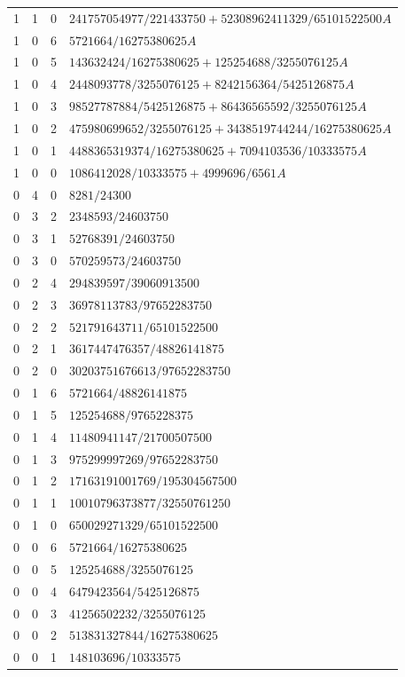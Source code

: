 \begin{longtable}{rrrl}
1 & 1 & 0 & $241757054977/221433750+52308962411329/65101522500A$\\
1 & 0 & 6 & $5721664/16275380625A$\\
1 & 0 & 5 & $143632424/16275380625+125254688/3255076125A$\\
1 & 0 & 4 & $2448093778/3255076125+8242156364/5425126875A$\\
1 & 0 & 3 & $98527787884/5425126875+86436565592/3255076125A$\\
1 & 0 & 2 & $475980699652/3255076125+3438519744244/16275380625A$\\
1 & 0 & 1 & $4488365319374/16275380625+7094103536/10333575A$\\
1 & 0 & 0 & $1086412028/10333575+4999696/6561A$\\
0 & 4 & 0 & $8281/24300$\\
0 & 3 & 2 & $2348593/24603750$\\
0 & 3 & 1 & $52768391/24603750$\\
0 & 3 & 0 & $570259573/24603750$\\
0 & 2 & 4 & $294839597/39060913500$\\
0 & 2 & 3 & $36978113783/97652283750$\\
0 & 2 & 2 & $521791643711/65101522500$\\
0 & 2 & 1 & $3617447476357/48826141875$\\
0 & 2 & 0 & $30203751676613/97652283750$\\
0 & 1 & 6 & $5721664/48826141875$\\
0 & 1 & 5 & $125254688/9765228375$\\
0 & 1 & 4 & $11480941147/21700507500$\\
0 & 1 & 3 & $975299997269/97652283750$\\
0 & 1 & 2 & $17163191001769/195304567500$\\
0 & 1 & 1 & $10010796373877/32550761250$\\
0 & 1 & 0 & $650029271329/65101522500$\\
0 & 0 & 6 & $5721664/16275380625$\\
0 & 0 & 5 & $125254688/3255076125$\\
0 & 0 & 4 & $6479423564/5425126875$\\
0 & 0 & 3 & $41256502232/3255076125$\\
0 & 0 & 2 & $513831327844/16275380625$\\
0 & 0 & 1 & $148103696/10333575$\\
\bottomrule
\end{longtable}
